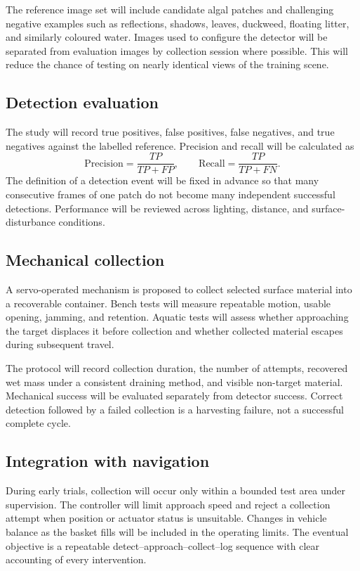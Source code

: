 \documentclass[12pt,a4paper]{article}
\begin{document}
The reference image set will include candidate algal patches and challenging negative examples such as reflections, shadows, leaves, duckweed, floating litter, and similarly coloured water. Images used to configure the detector will be separated from evaluation images by collection session where possible. This will reduce the chance of testing on nearly identical views of the training scene.

\subsection{Detection evaluation}
The study will record true positives, false positives, false negatives, and true negatives against the labelled reference. Precision and recall will be calculated as
\[
\mathrm{Precision}=\frac{TP}{TP+FP},\qquad
\mathrm{Recall}=\frac{TP}{TP+FN}.
\]
The definition of a detection event will be fixed in advance so that many consecutive frames of one patch do not become many independent successful detections. Performance will be reviewed across lighting, distance, and surface-disturbance conditions.

\subsection{Mechanical collection}
A servo-operated mechanism is proposed to collect selected surface material into a recoverable container. Bench tests will measure repeatable motion, usable opening, jamming, and retention. Aquatic tests will assess whether approaching the target displaces it before collection and whether collected material escapes during subsequent travel.

The protocol will record collection duration, the number of attempts, recovered wet mass under a consistent draining method, and visible non-target material. Mechanical success will be evaluated separately from detector success. Correct detection followed by a failed collection is a harvesting failure, not a successful complete cycle.

\subsection{Integration with navigation}
During early trials, collection will occur only within a bounded test area under supervision. The controller will limit approach speed and reject a collection attempt when position or actuator status is unsuitable. Changes in vehicle balance as the basket fills will be included in the operating limits. The eventual objective is a repeatable detect--approach--collect--log sequence with clear accounting of every intervention.
\end{document}
